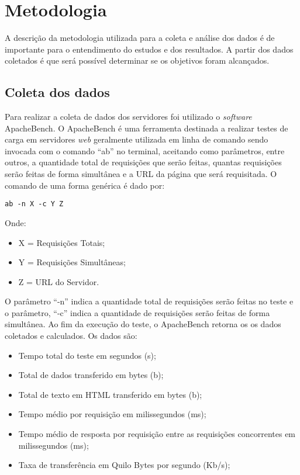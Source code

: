 \chapter{Metodologia}\label{cap:metodologia}

A descrição da metodologia utilizada para a coleta e análise dos dados é de 
importante para o entendimento do estudos e dos resultados. A partir dos dados 
coletados é que será possível determinar se os objetivos foram alcançados.

\section{Coleta dos dados}

Para realizar a coleta de dados dos servidores foi utilizado o 
\textit{software} ApacheBench. O ApacheBench é uma ferramenta destinada a 
realizar testes de carga em servidores \textit{web} geralmente utilizada em 
linha de comando sendo invocada com o comando ``ab'' no terminal, aceitando 
como parâmetros, entre outros, a quantidade total de requisições que serão 
feitas, quantas requisições serão feitas de forma simultânea e a URL da página 
que será requisitada. O comando de uma forma genérica é dado por:

\begin{verbatim}
ab -n X -c Y Z
\end{verbatim}
Onde:

	\begin{itemize}
		\item X = Requisições Totais;
		\item Y = Requisições Simultâneas;
		\item Z = URL do Servidor.
	\end{itemize}

O parâmetro ``-n'' indica a quantidade total de requisições serão feitas no 
teste e o parâmetro, ``-c'' indica a quantidade de requisições serão feitas de 
forma simultânea. Ao fim da execução do teste, o ApacheBench retorna os os 
dados coletados e calculados. Os dados são:

\begin{itemize}
	\item Tempo total do teste em segundos (s);
	\item Total de dados transferido em bytes (b);
	\item Total de texto em HTML transferido em bytes (b);
	\item Tempo médio por requisição em milissegundos (ms);
	\item Tempo médio de resposta por requisição entre as requisições 
	concorrentes em milissegundos (ms);
	\item Taxa de transferência em Quilo Bytes por segundo (Kb/s);
\end{itemize}

